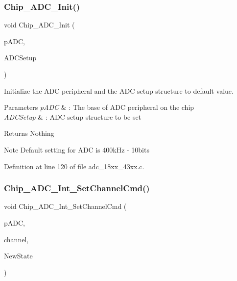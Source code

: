 \subsubsection{\texorpdfstring{Chip\+\_\+\+A\+D\+C\+\_\+\+Init()}{Chip\_ADC\_Init()}}
{\footnotesize\ttfamily void Chip\+\_\+\+A\+D\+C\+\_\+\+Init (\begin{DoxyParamCaption}\item[{\hyperlink{struct_l_p_c___a_d_c___t}{L\+P\+C\+\_\+\+A\+D\+C\+\_\+T} $\ast$}]{p\+A\+DC,  }\item[{\hyperlink{struct_a_d_c___c_l_o_c_k___s_e_t_u_p___t}{A\+D\+C\+\_\+\+C\+L\+O\+C\+K\+\_\+\+S\+E\+T\+U\+P\+\_\+T} $\ast$}]{A\+D\+C\+Setup }\end{DoxyParamCaption})}



Initialize the A\+DC peripheral and the A\+DC setup structure to default value. 


\begin{DoxyParams}{Parameters}
{\em p\+A\+DC} & \+: The base of A\+DC peripheral on the chip \\
\hline
{\em A\+D\+C\+Setup} & \+: A\+DC setup structure to be set \\
\hline
\end{DoxyParams}
\begin{DoxyReturn}{Returns}
Nothing 
\end{DoxyReturn}
\begin{DoxyNote}{Note}
Default setting for A\+DC is 400k\+Hz -\/ 10bits 
\end{DoxyNote}


Definition at line 120 of file adc\+\_\+18xx\+\_\+43xx.\+c.

\mbox{\label{group___a_d_c__18_x_x__43_x_x_gac0bf9a8d016bcd88866d4ae59b1ca78c}} 
\subsubsection{\texorpdfstring{Chip\+\_\+\+A\+D\+C\+\_\+\+Int\+\_\+\+Set\+Channel\+Cmd()}{Chip\_ADC\_Int\_SetChannelCmd()}}
{\footnotesize\ttfamily void Chip\+\_\+\+A\+D\+C\+\_\+\+Int\+\_\+\+Set\+Channel\+Cmd (\begin{DoxyParamCaption}\item[{\hyperlink{struct_l_p_c___a_d_c___t}{L\+P\+C\+\_\+\+A\+D\+C\+\_\+T} $\ast$}]{p\+A\+DC,  }\item[{uint8\+\_\+t}]{channel,  }\item[{\hyperlink{group___l_p_c___types___public___types_gac9a7e9a35d2513ec15c3b537aaa4fba1}{Functional\+State}}]{New\+State }\end{DoxyParamCaption})}



